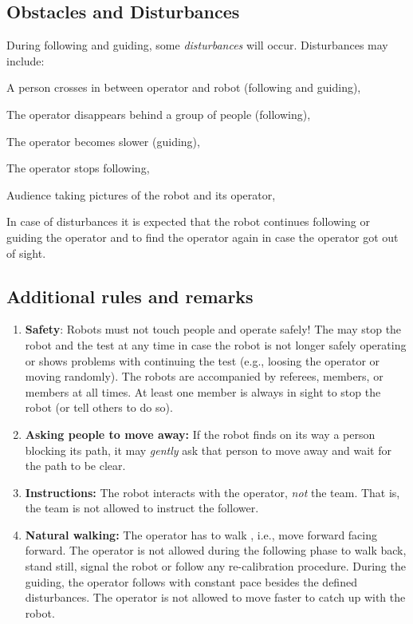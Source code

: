 \subsection{Obstacles and Disturbances}
During following and guiding, some \emph{disturbances} will occur. 
Disturbances may include:
\begin{compactitem}
\item A person crosses in between operator and robot (following and guiding), 
\item The operator disappears behind a group of people (following),
\item The operator becomes slower (guiding),
\item The operator stops following,
\item Audience taking pictures of the robot and its operator,
\end{compactitem}
In case of disturbances it is expected that the robot continues following or guiding the operator and to find the operator again in case the operator got out of sight.

\subsection{Additional rules and remarks}
\begin{enumerate}
\item \textbf{Safety}: Robots must not touch people and operate safely! 
  The \TC may stop the robot and the test at any time in case the robot is not longer safely operating or shows problems with continuing the test (e.g., loosing the operator or moving randomly).
  The robots are accompanied by referees, \OC members, or \TC members at all times.
  At least one \TC member is always in sight to stop the robot (or tell others to do so).
\item \textbf{Asking people to move away:} If the robot finds on its way a person blocking its path, it may \textit{gently} ask that person to move away and wait for the path to be clear. 
\item \textbf{Instructions:} The robot interacts with the operator, \emph{not} the team. 
  That is, the team is not allowed to instruct the follower.
\item \textbf{Natural walking:} The operator has to walk , i.e., move forward facing forward. 
  The operator is not allowed during the following phase to walk back, stand still, signal the robot or follow any re-calibration procedure.
  During the guiding, the operator follows with constant pace besides the defined disturbances. 
  The operator is not allowed to move faster to catch up with the robot. 
\end{enumerate}

